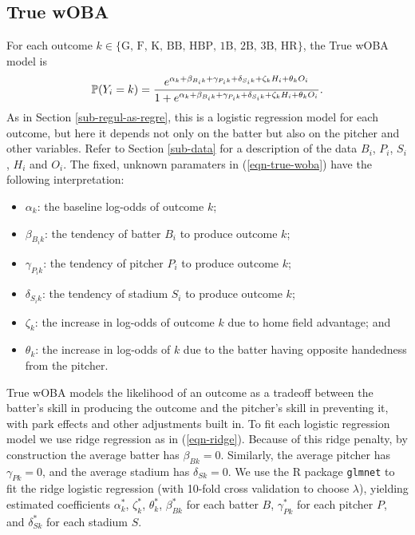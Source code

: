 \documentclass[11pt]{article}
\begin{document}
\subsection{True wOBA}

For each outcome $k \in \{\mbox{G, F, K, BB, HBP, 1B, 2B, 3B, HR}\}$, the True
wOBA model is
\begin{equation}
\label{eqn-true-woba}
\mathbb P(Y_i = k) = \frac{e^{\alpha_k + \beta_{B_ik} + \gamma_{P_ik} +
    \delta_{S_ik} + \zeta_kH_i + \theta_kO_i}}{1 + e^{\alpha_k + \beta_{B_ik} +
    \gamma_{P_ik} + \delta_{S_ik} + \zeta_kH_i + \theta_kO_i}}.
\end{equation}
As in Section \ref{sub-regul-as-regre}, this is a logistic regression model for
each outcome, but here it depends not only on the batter but also on the
pitcher and other variables. Refer to Section \ref{sub-data} for a description
of the data $B_i$, $P_i$, $S_i$, $H_i$ and $O_i$. The fixed, unknown paramaters
in (\ref{eqn-true-woba}) have the following interpretation:
\begin{itemize}
\item $\alpha_k$: the baseline log-odds of outcome $k$;
\item $\beta_{B_ik}$: the tendency of batter $B_i$ to produce outcome $k$;
\item $\gamma_{P_ik}$: the tendency of pitcher $P_i$ to produce outcome $k$;
\item $\delta_{S_ik}$: the tendency of stadium $S_i$ to produce outcome $k$;
\item $\zeta_k$: the increase in log-odds of outcome $k$ due to home field
    advantage; and
\item $\theta_k$: the increase in log-odds of $k$ due to the batter
    having opposite handedness from the pitcher.
\end{itemize}

True wOBA models the likelihood of an outcome as a tradeoff between the
batter's skill in producing the outcome and the pitcher's skill in preventing
it, with park effects and other adjustments built in. To fit each logistic
regression model we use ridge regression as in (\ref{eqn-ridge}). Because of
this ridge penalty, by construction the average batter has $\beta_{Bk} = 0$.
Similarly, the average pitcher has $\gamma_{Pk} = 0$, and the average stadium
has $\delta_{Sk} = 0$. We use the R package {\tt glmnet} \citep{glmnet} to fit
the ridge logistic regression (with 10-fold cross validation to choose
$\lambda$), yielding estimated coefficients $\alpha_k^*$, $\zeta_k^*$,
$\theta_k^*$, $\beta_{Bk}^*$ for each batter $B$, $\gamma_{Pk}^*$ for each
pitcher $P$, and $\delta_{Sk}^*$ for each stadium $S$.
\end{document}
